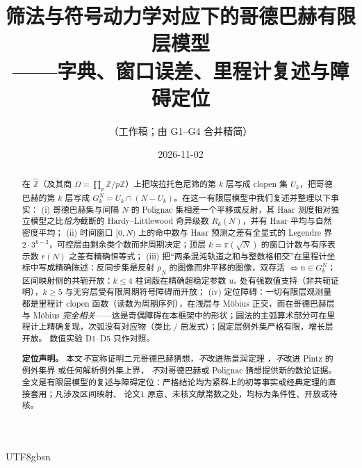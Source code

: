 \documentclass[11pt,a4paper]{article}
\newcommand{\Zhat}{\widehat{\mathbb Z}}
\newcommand{\Om}{\Omega}               %
\newcommand{\ust}{u_{*}}               %
\theoremstyle{plain}
\theoremstyle{definition}
\begin{document}
\begin{CJK}{UTF8}{gbsn}

\title{筛法与符号动力学对应下的哥德巴赫有限层模型\\[2pt]
\large ——{}字典、窗口误差、里程计复述与障碍定位}
\author{（工作稿；由 G1--G4 合并精简）}
\date{2026-11-02}
\maketitle

\begin{abstract}
在 $\Zhat$（及其商 $\Om=\prod_p\mathbb Z/p\mathbb Z$）上把埃拉托色尼筛的第 $k$ 层写成 clopen 集 $U_k$，把哥德巴赫的第 $k$ 层写成
$G_k^N=U_k\cap(N-U_k)$。在这一有限层模型中我们复述并整理以下事实：
(i) 哥德巴赫集与间隔 $N$ 的 Polignac 集相差一个平移或反射，其 Haar 测度相对独立模型之比\emph{恰为}截断的 Hardy--Littlewood 奇异级数 $R_k(N)$，并有 Haar 平均与自然密度平均；
(ii) 时间窗口 $[0,N)$ 上的命中数与 Haar 预测之差有全显式的 Legendre 界 $2\cdot3^{k-2}$，可控层由剩余类个数而非周期决定；顶层 $k=\pi(\sqrt N)$ 的窗口计数与有序表示数 $r(N)$ 之差有精确恒等式；
(iii) 把“两条混沌轨道之和与整数格相交”在里程计坐标中写成精确陈述：反同步集是反射 $\rho_N$ 的图像而非平移的图像，双存活 $\iff n\in G_k^N$；区间映射侧的共轭开放：$k\le4$ 柱词版在精确超稳定参数 $\ust$ 处有强数值支持（非共轭证明），$k\ge5$ 与无穷层受有限周期符号障碍而开放；
(iv) 定位障碍：一切有限层观测量都是里程计 clopen 函数（读数为周期序列），在浅层与 M\"obius 正交，而在哥德巴赫层与 M\"obius \emph{完全相关}——这是奇偶障碍在本框架中的形状；圆法的主弧算术部分可在里程计上精确复现，次弧没有对应物（类比 / 启发式）；固定层例外集严格有限，增长层开放。
数值实验 D1--D5 只作对照。

\textbf{定位声明。} 本文\emph{不}宣称证明二元哥德巴赫猜想，\emph{不}改进陈景润定理 \cite{Chen73}，\emph{不}改进 Pintz 的例外集界 \cite{Pin18} 或任何解析例外集上界，
\emph{不}对哥德巴赫或 Polignac 猜想提供新的数论证据。全文是有限层模型的复述与障碍定位：严格结论均为紧群上的初等事实或经典定理的直接套用；凡涉及区间映射、
论文1 \cite{Wang26} 原意、未核文献常数之处，均标为条件性、开放或待核。
\end{abstract}


\end{CJK}
\end{document}
